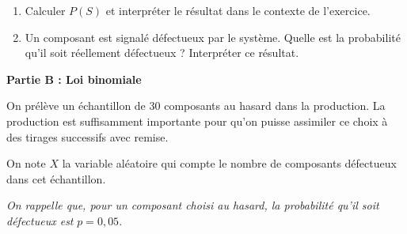 \documentclass[TC, exos, e,p]{phBook}
\begin{document}
\begin{exercice}
\begin{enonce}
\begin{enumerate}
\begin{center}
\end{center}

\item Calculer $P(S)$ et interpréter le résultat dans le contexte de l'exercice.

\item Un composant est signalé défectueux par le système. Quelle est la probabilité qu'il soit réellement défectueux ? Interpréter ce résultat.
\end{enumerate}

\bigskip

\textbf{Partie B : Loi binomiale}

On prélève un échantillon de $30$ composants au hasard dans la production. La production est suffisamment importante pour qu'on puisse assimiler ce choix à des tirages successifs avec remise.

On note $X$ la variable aléatoire qui compte le nombre de composants défectueux dans cet échantillon.

\emph{On rappelle que, pour un composant choisi au hasard, la probabilité qu'il soit défectueux est} $p = 0,05$.


\end{enonce}
\end{exercice}
\end{document}
